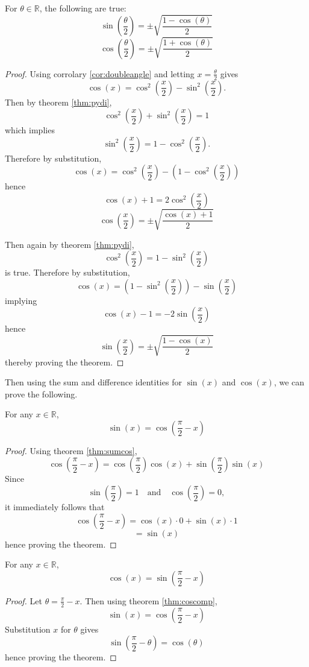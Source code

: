 \documentclass[11pt]{article}
\numberwithin{lemma}{section}
\numberwithin{equation}{section}
\numberwithin{define}{section}
\numberwithin{prop}{section}
\numberwithin{figure}{section}
\numberwithin{theorem}{section}
\numberwithin{cor}{section}
\newcounter{ex}[section]
\numberwithin{ex}{section}
\def\real{\mathbb{R}}
\def\paren#1{\left(#1\right)}
\def\jand{\quad\text{and}\quad}
\begin{document}
\begin{cor}
	For $\theta\in\real$, the following are true:
	$$\sin\paren{\frac{\theta}{2}}=\pm\sqrt{\frac{1-\cos(\theta)}{2}}$$
	$$\cos\paren{\frac{\theta}{2}}=\pm\sqrt{\frac{1+\cos(\theta)}{2}}$$
\end{cor}
\begin{proof}
	Using corrolary \eqref{cor:doubleangle} and letting $x=\frac{\theta}{2}$ gives
	$$\cos(x)=\cos^2\paren{\frac{x}{2}}-\sin^2\paren{\frac{x}{2}}.$$
	Then by theorem \eqref{thm:pydi},
	$$\cos^2(\frac{x}{2})+\sin^2(\frac{x}{2})=1$$
	which implies
	$$\sin^2\paren{\frac{x}{2}}=1-\cos^2\paren{\frac{x}{2}}.$$
	Therefore by substitution,
	$$\cos(x)=\cos^2\paren{\frac{x}{2}}-\paren{1-\cos^2\paren{\frac{x}{2}}}$$
	hence
	$$\cos(x)+1=2\cos^2\paren{\frac{x}{2}}$$
	$$\cos\paren{\frac{x}{2}}=\pm\sqrt{\frac{\cos(x)+1}{2}}$$
	
	Then again by theorem \eqref{thm:pydi},
	$$\cos^2\paren{\frac{x}{2}}=1-\sin^2\paren{\frac{x}{2}}$$
	is true.
	Therefore by substitution,
	$$\cos(x)=\paren{1-\sin^2\paren{\frac{x}{2}}}-\sin\paren{\frac{x}{2}}$$
	implying
	$$\cos(x)-1=-2\sin\paren{\frac{x}{2}}$$
	hence
	$$\sin\paren{\frac{x}{2}}=\pm\sqrt{\frac{1-\cos(x)}{2}}$$
	thereby proving the theorem.
\end{proof}

Then using the sum and difference identities for $\sin(x)$ and $\cos(x)$, we can prove the following.

\begin{theorem}
For any $x\in\real$,
$$\sin(x)=\cos\paren{\frac{\pi}{2}-x}$$
\label{thm:coscomp}
\end{theorem}
\begin{proof}
	Using theorem \eqref{thm:sumcos},
	$$\cos\paren{\frac{\pi}{2}-x}=\cos\paren{\frac{\pi}{2}}\cos(x)+\sin\paren{\frac{\pi}{2}}\sin(x)$$
	Since
	$$\sin\paren{\frac{\pi}{2}}=1 \jand \cos\paren{\frac{\pi}{2}}=0,$$
	it immediately follows that
	$$\cos\paren{\frac{\pi}{2}-x}=\cos(x)\cdot 0 + \sin(x)\cdot 1$$
	$$=\sin(x)$$
	hence proving the theorem.
\end{proof}

\begin{cor}
	For any $x\in\real$,
	$$\cos(x)=\sin\paren{\frac{\pi}{2}-x}$$
	\label{cor:sincomp}
\end{cor}
\begin{proof}
	Let $\theta=\frac{\pi}{2}-x$. Then using theorem \eqref{thm:coscomp},
	$$\sin(x)=\cos\paren{\frac{\pi}{2}-x}$$
	Substitution $x$ for $\theta$ gives
	$$\sin\paren{\frac{\pi}{2}-\theta}=\cos(\theta)$$
	hence proving the theorem.
\end{proof}
\end{document}
